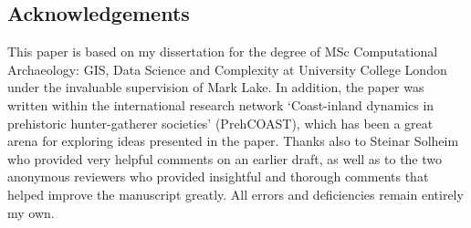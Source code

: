 \documentclass[12pt, a4paper]{article}
\begin{document}
\subsection*{Acknowledgements}
This paper is based on my dissertation for the degree of MSc Computational Archaeology: GIS, Data Science and Complexity at University College London under the invaluable supervision of Mark Lake. In addition, the paper was written within the international research network `Coast-inland dynamics in prehistoric hunter-gatherer societies' (PrehCOAST), which has been a great arena for exploring ideas presented in the paper. Thanks also to Steinar Solheim who provided very helpful comments on an earlier draft, as well as to the two anonymous reviewers who provided insightful and thorough comments that helped improve the manuscript greatly. All errors and deficiencies remain entirely my own.


\end{document}
